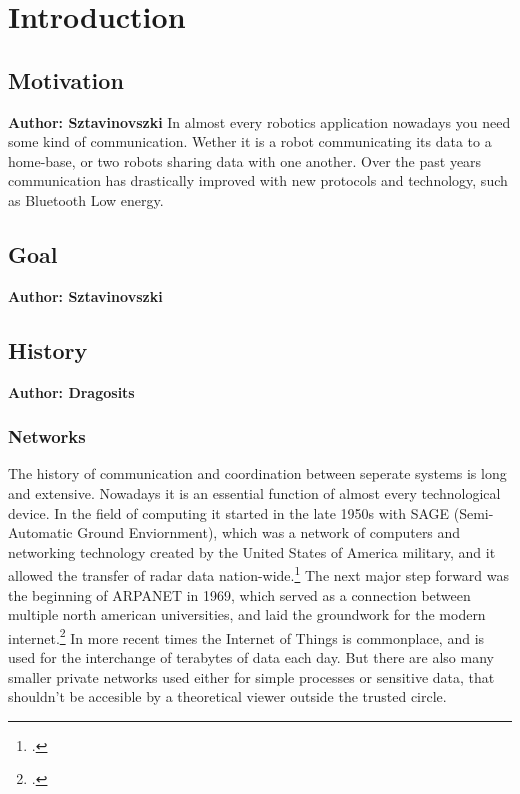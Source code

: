 \chapter{Introduction}


\vspace{2mm}

\section{Motivation}
\textbf{Author: Sztavinovszki}
In almost every robotics application nowadays you need some kind of communication. Wether it is a robot communicating
its data to a home-base, or two robots sharing data with one another. Over the past years communication has drastically
improved with new protocols and technology, such as Bluetooth Low energy.

\section{Goal}
\textbf{Author: Sztavinovszki}

\section{History}
\textbf{Author: Dragosits}
\subsection{Networks}
The history of communication and coordination between seperate systems is long and extensive. Nowadays it is an essential 
function of almost every technological device. In the field of computing it started in the late 1950s with SAGE (Semi-Automatic Ground Enviornment),
which was a network of computers and networking technology created by the United States of America military, 
and it allowed the transfer of radar data nation-wide.\footcite[][89]{A_New_History_of_Modern_Computing}
The next major step forward was the beginning of ARPANET in 1969, which served as a connection between multiple north american 
universities, and laid the groundwork for the modern internet.\footcite[][25]{How_the_web_was_born}
In more recent times the Internet of Things is commonplace, and is used for the interchange of terabytes of data each day. 
But there are also many smaller private networks used either for simple processes or sensitive data, that shouldn't be 
accesible by a theoretical viewer outside the trusted circle. 

